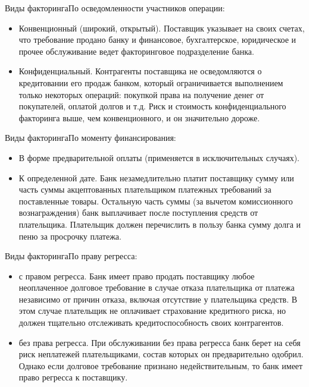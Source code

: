 \documentclass[_Banking_p3.tex]{subfiles}
\begin{document}
\begin{frame}[ allowframebreaks ] {Виды факторинга}{По осведомленности участников операции:}
\begin{itemize}
\item
Конвенционный (широкий, открытый). Поставщик указывает на своих счетах, что требование продано банку и финансовое, бухгалтерское, юридическое и прочее обслуживание ведет факторинговое подразделение банка.

\pagebreak
\item
Конфиденциальный. Контрагенты поставщика не осведомляются о кредитовании его продаж банком, который ограничивается выполнением только некоторых операций: покупкой права на получение денег от покупателей, оплатой долгов и т.д. Риск и стоимость конфиденциального факторинга выше, чем конвенционного, и он значительно дороже.

\end{itemize}


\end{frame}
\begin{frame} {Виды факторинга}{По моменту финансирования:}
\begin{itemize}[<+->]
\item
В форме предварительной оплаты (применяется в исключительных случаях). 

\item
К определенной дате. Банк незамедлительно платит поставщику сумму или часть суммы акцептованных плательщиком платежных требований за поставленные товары. Остальную часть суммы (за вычетом комиссионного вознаграждения) банк выплачивает после поступления средств от плательщика. Плательщик должен перечислить в пользу банка сумму долга и пеню за просрочку платежа.

\end{itemize}


\end{frame}
\begin{frame} [ allowframebreaks ] {Виды факторинга}{По праву регресса:}
\begin{itemize}
\item
с правом регресса. Банк имеет право продать поставщику любое неоплаченное долговое требование в случае отказа плательщика от платежа независимо от причин отказа, включая отсутствие у плательщика средств. В этом случае плательщик не оплачивает страхование кредитного риска, но должен тщательно отслеживать кредитоспособность своих контрагентов.

\pagebreak
\item
без права регресса. При обслуживании без права регресса банк берет на себя риск неплатежей плательщиками, состав которых он предварительно одобрил. Однако если долговое требование признано недействительным, то банк имеет право регресса к поставщику. 

\end{itemize}

\end{frame}
\end{document}
